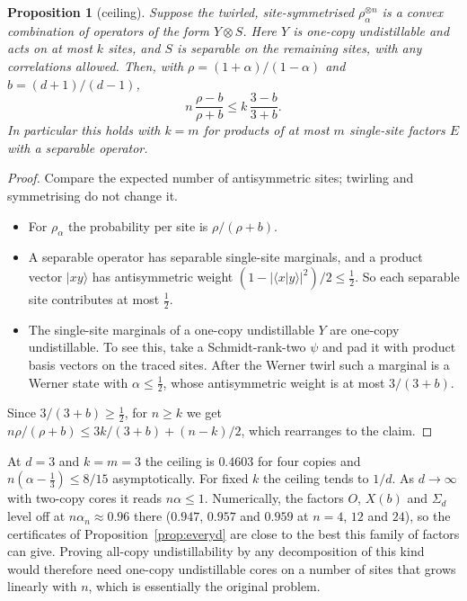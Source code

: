 \documentclass[11pt]{article}
\newtheorem{proposition}[theorem]{Proposition}
\theoremstyle{remark}
\begin{document}
\begin{proposition}[ceiling]\label{prop:ceiling}
Suppose the twirled, site-symmetrised $\rho_\alpha^{\otimes n}$ is a convex combination of operators of the form
$Y\otimes S$. Here $Y$ is one-copy undistillable and acts on at most $k$ sites, and $S$ is separable on the remaining
sites, with any correlations allowed. Then, with $\rho=(1+\alpha)/(1-\alpha)$ and $b=(d+1)/(d-1)$,
\[
n\,\frac{\rho-b}{\rho+b}\le k\,\frac{3-b}{3+b}.
\]
In particular this holds with $k=m$ for products of at most $m$ single-site factors $E$ with a separable operator.
\end{proposition}
\begin{proof}
Compare the expected number of antisymmetric sites; twirling and symmetrising do not change it.
\begin{itemize}
\item For $\rho_\alpha$ the probability per site is $\rho/(\rho+b)$.
\item A separable operator has separable single-site marginals, and a product vector $|xy\rangle$ has antisymmetric
weight $(1-|\langle x|y\rangle|^2)/2\le\frac12$. So each separable site contributes at most $\frac12$.
\item The single-site marginals of a one-copy undistillable $Y$ are one-copy undistillable. To see this, take a
Schmidt-rank-two $\psi$ and pad it with product basis vectors on the traced sites. After the Werner twirl such a
marginal is a Werner state with $\alpha\le\frac12$, whose antisymmetric weight is at most $3/(3+b)$.
\end{itemize}
Since $3/(3+b)\ge\frac12$, for $n\ge k$ we get $n\rho/(\rho+b)\le 3k/(3+b)+(n-k)/2$, which rearranges to the
claim.
\end{proof}
At $d=3$ and $k=m=3$ the ceiling is $0.4603$ for four copies and $n(\alpha-\frac13)\le8/15$ asymptotically. For fixed
$k$ the ceiling tends to $1/d$. As $d\to\infty$ with two-copy cores it reads $n\alpha\le1$. Numerically, the factors
$O$, $X(b)$ and $\Sigma_d$ level off at $n\alpha_n\approx0.96$ there ($0.947$, $0.957$ and $0.959$ at $n=4$, $12$ and
$24$), so the certificates of Proposition~\ref{prop:everyd} are close to the best this family of factors can give. Proving all-copy undistillability by any decomposition of this kind would therefore
need one-copy undistillable cores on a number of sites that grows linearly with $n$, which is essentially the
original problem.
\end{document}
